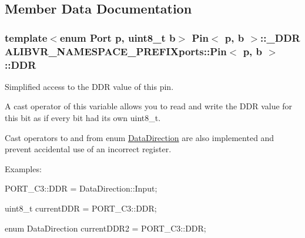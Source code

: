 \subsection{Member Data Documentation}
\subsubsection[{\texorpdfstring{D\+DR}{DDR}}]{\setlength{\rightskip}{0pt plus 5cm}template$<$enum Port p, uint8\+\_\+t b$>$ {\bf Pin}$<$ p, b $>$\+::{\bf \+\_\+\+D\+DR} {\bf A\+L\+I\+B\+V\+R\+\_\+\+N\+A\+M\+E\+S\+P\+A\+C\+E\+\_\+\+P\+R\+E\+F\+I\+Xports\+::\+Pin}$<$ p, b $>$\+::D\+DR\hspace{0.3cm}{\ttfamily [static]}}\hypertarget{structALIBVR__NAMESPACE__PREFIXports_1_1Pin_a7a8fd2de2412fd6b900c5f65249ac77b}{}\label{structALIBVR__NAMESPACE__PREFIXports_1_1Pin_a7a8fd2de2412fd6b900c5f65249ac77b}


Simplified access to the D\+DR value of this pin. 

A cast operator of this variable allows you to read and write the D\+DR value for this bit as if every bit had its own uint8\+\_\+t.

Cast operators to and from enum \hyperlink{namespaceALIBVR__NAMESPACE__PREFIXports_a726f0120b8d4e0856e47f3daf19bd725}{Data\+Direction} are also implemented and prevent accidental use of an incorrect register.

Examples\+:


\begin{DoxyItemize}
\item {\ttfamily P\+O\+R\+T\+\_\+\+C3\+::\+D\+DR = Data\+Direction\+::\+Input;}
\item {\ttfamily uint8\+\_\+t current\+D\+DR = P\+O\+R\+T\+\_\+\+C3\+::\+D\+DR;}
\item {\ttfamily enum Data\+Direction current\+D\+D\+R2 = P\+O\+R\+T\+\_\+\+C3\+::\+D\+DR;} 
\end{DoxyItemize}
